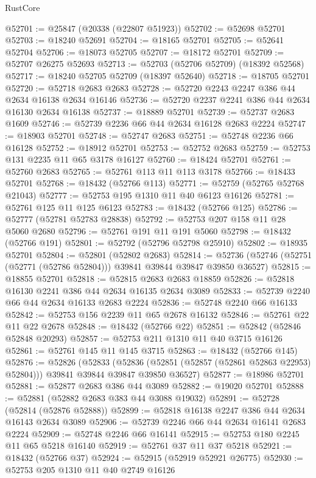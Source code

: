 \begin{lexlean}{RustCore}
\begin{coremodule}
@52701 := @25847 (@20338 (@22807 @51923))
@52702 := @52698 @52701
@52703 := @18240 @52691
@52704 := @18165 @52701
@52705 := @52641 @52704
@52706 := @18073 @52705
@52707 := @18172 @52701
@52709 := @52707 @26275 @52693
@52713 := @52703 (@52706 @52709) (@18392 @52568)
@52717 := @18240 @52705 @52709 (@18397 @52640)
@52718 := @18705 @52701
@52720 := @52718 @2683 @2683
@52728 := @52720 @2243 @2247 @386 @44 @2634 @16138 @2634 @16146
@52736 := @52720 @2237 @2241 @386 @44 @2634 @16130 @2634 @16138
@52737 := @18889 @52701
@52739 := @52737 @2683 @1609
@52746 := @52739 @2236 @66 @44 @2634 @16128 @2683 @2224
@52747 := @18903 @52701
@52748 := @52747 @2683
@52751 := @52748 @2236 @66 @16128
@52752 := @18912 @52701
@52753 := @52752 @2683
@52759 := @52753 @131 @2235 @11 @65 @3178 @16127
@52760 := @18424 @52701
@52761 := @52760 @2683
@52765 := @52761 @113 @11 @113 @3178
@52766 := @18433 @52701
@52768 := @18432 (@52766 @113)
@52771 := @52759 (@52765 @52768 @21043)
@52777 := @52753 @195 @1310 @11 @40 @6123 @16126
@52781 := @52761 @125 @11 @125 @6123
@52783 := @18432 (@52766 @125)
@52786 := @52777 (@52781 @52783 @28838)
@52792 := @52753 @207 @158 @11 @28 @5060 @2680
@52796 := @52761 @191 @11 @191 @5060
@52798 := @18432 (@52766 @191)
@52801 := @52792 (@52796 @52798 @25910)
@52802 := @18935 @52701
@52804 := @52801 (@52802 @2683)
@52814 := @52736 (@52746 (@52751 (@52771 (@52786 @52804))) @39841 @39844 @39847 @39850 @36527)
@52815 := @18855 @52701
@52818 := @52815 @2683 @2683 @18859
@52826 := @52818 @16130 @2241 @386 @44 @2634 @16135 @2634 @3089
@52833 := @52739 @2240 @66 @44 @2634 @16133 @2683 @2224
@52836 := @52748 @2240 @66 @16133
@52842 := @52753 @156 @2239 @11 @65 @2678 @16132
@52846 := @52761 @22 @11 @22 @2678
@52848 := @18432 (@52766 @22)
@52851 := @52842 (@52846 @52848 @20293)
@52857 := @52753 @211 @1310 @11 @40 @3715 @16126
@52861 := @52761 @145 @11 @145 @3715
@52863 := @18432 (@52766 @145)
@52876 := @52826
    (@52833
      (@52836 (@52851 (@52857 (@52861 @52863 @22953) @52804)))
      @39841
      @39844
      @39847
      @39850
      @36527)
@52877 := @18986 @52701
@52881 := @52877 @2683 @386 @44 @3089
@52882 := @19020 @52701
@52888 := @52881 (@52882 @2683 @383 @44 @3088 @19032)
@52891 := @52728 (@52814 (@52876 @52888))
@52899 := @52818 @16138 @2247 @386 @44 @2634 @16143 @2634 @3089
@52906 := @52739 @2246 @66 @44 @2634 @16141 @2683 @2224
@52909 := @52748 @2246 @66 @16141
@52915 := @52753 @180 @2245 @11 @65 @5218 @16140
@52919 := @52761 @37 @11 @37 @5218
@52921 := @18432 (@52766 @37)
@52924 := @52915 (@52919 @52921 @26775)
@52930 := @52753 @205 @1310 @11 @40 @2749 @16126

\end{coremodule}
\end{lexlean}
